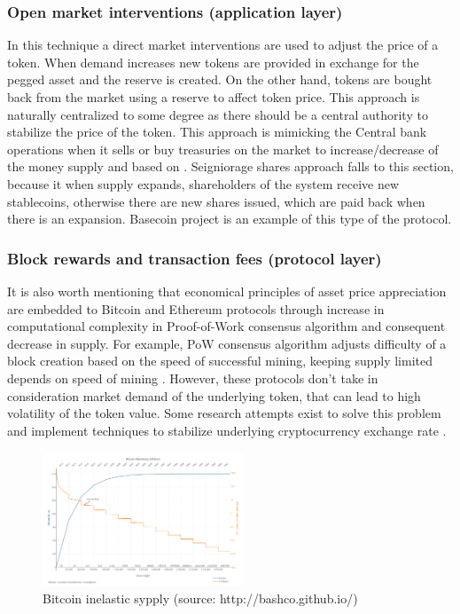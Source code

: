 \documentclass[12pt, a4paper, twocolumn]{article}
\begin{document}
\subsubsection{Open market interventions (application layer)}
In this technique a direct market interventions are used to adjust the price of a token. When demand increases new tokens are provided in exchange for the pegged asset and the reserve is created. On the other hand, tokens are bought back from the market using a reserve to affect token price. This approach is naturally centralized to some degree as there should be a central authority to stabilize the price of the token. This approach is mimicking the Central bank operations when it sells or buy treasuries on the market to increase/decrease of the money supply and based on . 
Seigniorage shares \cite{SeigniorageShares} approach falls to this section, because it  when supply expands, shareholders of the system receive new stablecoins, otherwise there are new shares issued, which are paid back when there is an expansion. Basecoin \cite{basis} project is an example of this type of the protocol.

\subsubsection{Block rewards and transaction fees (protocol layer)}

It is also worth mentioning that economical principles of asset price appreciation are embedded to Bitcoin  \cite{nakamoto2012bitcoin}  and Ethereum  \cite{buterin2014ethereum}  protocols through increase in computational complexity in Proof-of-Work consensus algorithm and consequent decrease in supply. For example, PoW consensus algorithm adjusts difficulty of a block creation based on the speed of successful mining, keeping supply limited depends on speed of mining . However, these protocols don't take in consideration market demand of the underlying token, that can lead to high volatility of the token value. Some research attempts exist to solve this problem and implement techniques to stabilize underlying cryptocurrency exchange rate \cite{1801.06771}.

\begin{figure}
  \includegraphics[width=\textwidth,height=4cm]{Bitcoin_Monetary_Inflation.png}
  \caption{Bitcoin inelastic sypply (source: http://bashco.github.io/)}
\end{figure}
\end{document}
